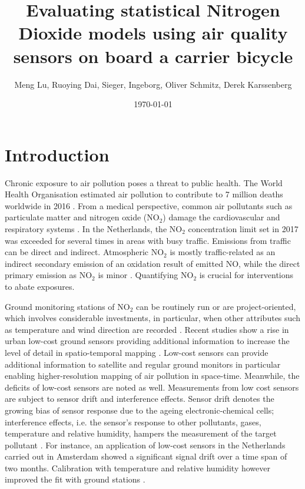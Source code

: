 \documentclass{article}
\title{Evaluating statistical Nitrogen Dioxide models using air quality sensors on board a carrier bicycle}
\author{Meng Lu,  Ruoying Dai, Sieger,  Ingeborg, Oliver Schmitz, Derek Karssenberg }
\date{\today}
\begin{document}
\maketitle

\section{Introduction}
Chronic exposure to air pollution poses a threat to public health. The World Health Organisation estimated air pollution to contribute to 7 million deaths worldwide in 2016 \citep{world2018burden}. From a medical perspective, common air pollutants such as particulate matter and nitrogen oxide (NO$_2$) damage the cardiovascular and respiratory systems \citep{anderson2012clearing, pascal2009effets}.  In the Netherlands, the NO$_2$ concentration limit set in 2017 was exceeded for several times in areas with busy traffic\citep{no2}. Emissions from traffic can be direct and indirect. Atmospheric NO$_2$ is mostly traffic-related as an indirect secondary emission of an oxidation result of emitted NO, while the direct primary emission as NO$_2$ is minor \citep{ukno2,no2}. Quantifying NO$_2$ is crucial for interventions to abate exposures.


 Ground monitoring stations of NO$_2$ can be routinely run or are project-oriented, which involves considerable investments, in particular, when other attributes such as temperature and wind direction are recorded \citep{hoek2008review}. Recent studies show a rise in urban low-cost ground sensors providing additional information to increase the level of detail in spatio-temporal mapping \citep{spinelle2015field, schneider2017mapping,isiugo2018assessing}. Low-cost sensors can provide additional information to satellite and regular ground monitors in particular enabling higher-resolution mapping of air pollution in space-time. Meanwhile, the deficits of low-cost sensors are noted as well. Measurements from low cost sensors are subject to sensor drift and interference effects. Sensor drift denotes the growing bias of sensor response due to the ageing electronic-chemical cells; interference effects, i.e. the sensor's response to other pollutants, gases, temperature and relative humidity, hampers the measurement of the target pollutant \citep{van2019calibration}. For instance, an application of low-cost sensors in the Netherlands carried out in Amsterdam showed a significant signal drift over a time span of two months. Calibration with temperature and relative humidity however improved the fit with ground stations \citep{mijling2018field}. 
 
\end{document}
